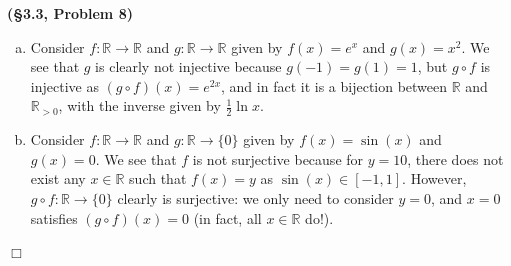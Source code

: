 \documentclass[12pt]{article}
\theoremstyle{definition}
\newenvironment{Solution}{\noindent {\sc Solution.}}{$\Box$ \vspace{2 ex}}
\begin{document}
\vspace{0.5cm}

\begin{Solution}
{\bf (\S3.3, Problem 8)}\\
\begin{enumerate}[(a)]
    \item Consider $f : \mathbb{R} \to \mathbb{R}$ and $g : \mathbb{R} \to \mathbb{R}$ given by $f(x) = e^x$ and $g(x)=x^2$. We see that $g$ is clearly not injective because $g(-1)=g(1)=1$, but $g \circ f$ is injective as $(g\circ f)(x) = e^{2x}$, and in fact it is a bijection between $\mathbb{R}$ and $\mathbb{R}_{> 0}$, with the inverse given by $\frac{1}{2} \ln x$.
    \item Consider $f : \mathbb{R} \to \mathbb{R}$ and $g : \mathbb{R} \to \{ 0\}$ given by $f(x) = \sin(x)$ and $g(x) = 0$. We see that $f$ is not surjective because for $y=10$, there does not exist any $x \in \mathbb R$ such that $f(x)=y$ as $\sin(x)\in [-1,1]$. However, $g\circ f : \mathbb{R} \to \{0\}$ clearly is surjective: we only need to consider $y=0$, and $x=0$ satisfies $(g\circ f)(x)=0$ (in fact, all $x \in \mathbb R$ do!).
\end{enumerate}
\end{Solution}

\vspace{0.5cm}
\end{document}
